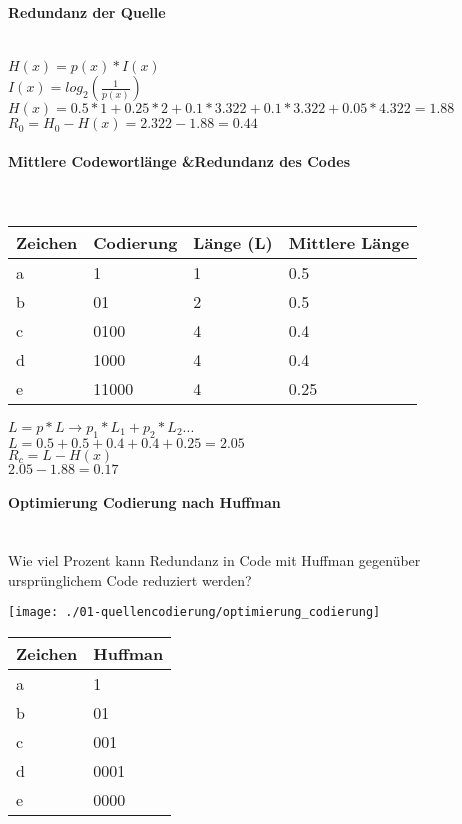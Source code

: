 \paragraph{Redundanz der Quelle}\mbox{}\\
$H(x) = p(x)*I(x)$\\
$I(x) = log_2(\frac{1}{p(x)})$\\
$H(x) = 0.5*1+0.25*2+0.1*3.322+0.1*3.322+0.05*4.322=1.88$
$R_0 = H_0 - H(x) = 2.322-1.88=0.44$

\paragraph{Mittlere Codewortlänge \&Redundanz des Codes}\mbox{}\\
\begin{center}
    \centering
    \begin{tabular}{p{1cm} | p{1.5cm} | p{1.5cm} | p{1.25cm}}
        \bfseries{Zeichen} & \bfseries{Codierung} & \bfseries{Länge (L)} & \bfseries{Mittlere Länge}\\ \hline
        a & 1 & 1 & 0.5\\ 
        b & 01 & 2 & 0.5\\
        c & 0100 & 4 & 0.4\\
        d & 1000 & 4 & 0.4\\
        e & 11000 & 4 & 0.25
    \end{tabular}
\end{center}
$L = p*L \rightarrow p_1*L_1+p_2*L_2...$\\
$L=0.5+0.5+0.4+0.4+0.25=2.05$\\
$R_c = L - H(x)$\\
$2.05-1.88=0.17$

\paragraph{Optimierung Codierung nach Huffman}\mbox{}\\
Wie viel Prozent kann Redundanz in Code mit Huffman gegenüber ursprünglichem Code reduziert werden?\\
\begin{center}
    \vspace{-8pt}
    \texttt{[image: ./01-quellencodierung/optimierung\_codierung]}
    \vspace{-8pt}
\end{center}

\begin{center}
    \centering
    \begin{tabular}{l | l}
        \bfseries{Zeichen} & \bfseries{Huffman}\\ \hline
        a & 1\\ 
        b & 01\\
        c & 001\\
        d & 0001\\
        e & 0000\\
    \end{tabular}
\end{center}

